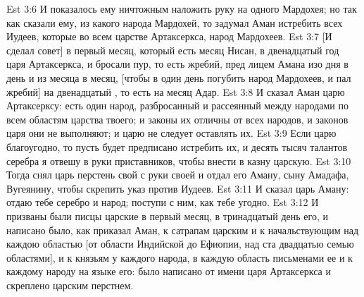 \vs Est 3:6 И показалось ему ничтожным наложить руку на одного Мардохея; но так как сказали ему, из какого народа Мардохей, то задумал Аман истребить всех Иудеев, которые  во всем царстве Артаксеркса,  народ Мардохеев.
\vs Est 3:7 [И сделал совет] в первый месяц, который есть месяц Нисан, в двенадцатый год царя Артаксеркса, и бросали пур, то есть жребий, пред лицем Амана изо дня в день и из месяца в месяц, [чтобы в один день погубить народ Мардохеев, и пал жребий] на двенадцатый , то есть на месяц Адар.
\vs Est 3:8 И сказал Аман царю Артаксерксу: есть один народ, разбросанный и рассеянный между народами по всем областям царства твоего; и законы их отличны от  всех народов, и законов царя они не выполняют; и царю не следует  оставлять их.
\vs Est 3:9 Если царю благоугодно, то пусть будет предписано истребить их, и десять тысяч талантов серебра я отвешу в руки приставников, чтобы внести в казну царскую.
\vs Est 3:10 Тогда снял царь перстень свой с руки своей и отдал его Аману, сыну Амадафа, Вугеянину, чтобы скрепить указ против Иудеев.
\vs Est 3:11 И сказал царь Аману: отдаю тебе  серебро и народ; поступи с ним, как тебе угодно.
\rsbpar\vs Est 3:12 И призваны были писцы царские в первый месяц, в тринадцатый день его, и написано было, как приказал Аман, к сатрапам царским и к начальствующим над каждою областью [от области Индийской до Ефиопии, над ста двадцатью семью областями], и к князьям у каждого народа, в каждую область письменами ее и к каждому народу на языке его:  было написано от имени царя Артаксеркса и скреплено царским перстнем.
